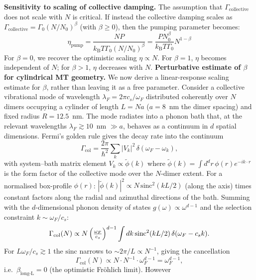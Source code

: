 \documentclass[twocolumn,10pt]{article}
\renewcommand{\hbar}{\hslash}
\newcommand{\kB}{k_{\text{B}}}
\begin{document}
\textbf{Sensitivity to scaling of collective damping.} The assumption that
$\Gamma_{\text{collective}}$ does not scale with $N$ is critical. If
instead the collective damping scales as $\Gamma_{\text{collective}}
= \Gamma_0 (N/N_0)^\beta$ (with $\beta \ge 0$), then the pumping
parameter becomes:
\begin{equation}
\eta_{\text{pump}} = \frac{N P}{\kB T \Gamma_0 (N/N_0)^\beta}
= \frac{P N_0^\beta}{\kB T \Gamma_0} N^{1-\beta}
\label{eq:eta_pump_beta}
\end{equation}
For $\beta = 0$, we recover the optimistic scaling $\eta \propto N$. For
$\beta = 1$, $\eta$ becomes independent of $N$; for $\beta > 1$, $\eta$
decreases with $N$.
\textbf{Perturbative estimate of $\beta$ for cylindrical MT geometry.}
We now derive a linear-response scaling estimate for $\beta$, rather than leaving it as a
free parameter.
Consider a collective vibrational mode of wavelength $\lambda_F=2\pi c_s
/\omega_F$ distributed coherently over $N$ dimers occupying a cylinder of
length $L=Na$ ($a=8$~nm the dimer spacing) and fixed radius $R=12.5$~nm.
The mode radiates into a phonon bath that, at the relevant wavelengths
$\lambda_F\gtrsim 10$~nm $\gg a$, behaves as a continuum in $d$ spatial
dimensions. Fermi's golden rule gives the decay rate into the continuum
\begin{equation}
\Gamma_{\text{col}}=\frac{2\pi}{\hbar^2}\sum_k|V_k|^2\,\delta(\omega_F
-\omega_k),
\end{equation}
with system--bath matrix element $V_k\propto \tilde\phi(k)$ where
$\tilde\phi(k)=\int d^d r\,\phi(r)e^{-i k\cdot r}$ is the form factor of
the collective mode over the $N$-dimer extent. For a normalised
box-profile $\phi(r)$:
$|\tilde\phi(k)|^2\propto N\,\mathrm{sinc}^2(kL/2)$ (along the axis) times
constant factors along the radial and azimuthal directions of the bath.
Summing with the $d$-dimensional phonon density of states
$g(\omega)\propto\omega^{d-1}$ and the selection constraint
$k\sim\omega_F/c_s$:
\begin{equation}
\Gamma_{\text{col}}(N)\propto N\,
\Bigl(\tfrac{\omega_F}{c_s}\Bigr)^{d-1}
\int dk\,\mathrm{sinc}^2(kL/2)\,\delta(\omega_F-c_s k).
\end{equation}
For $L\omega_F/c_s\gtrsim 1$ the $\mathrm{sinc}$ narrows to
$\sim 2\pi/L\propto N^{-1}$, giving the cancellation
\begin{equation}
\Gamma_{\text{col}}(N)\propto N\cdot N^{-1}\cdot\omega_F^{d-1}
=\omega_F^{d-1},
\end{equation}
i.e.\ $\beta_{\text{long-L}}=0$ (the optimistic Fr\"ohlich limit). However
\end{document}
